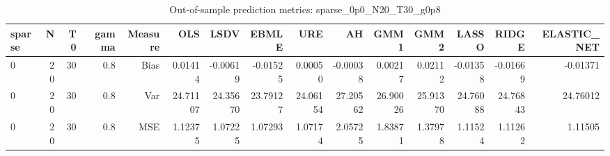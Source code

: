 \begin{table}[!htbp]\centering
\caption{Out-of-sample prediction metrics: sparse_0p0_N20_T30_g0p8}
\label{tab:table3_sparse_0p0_N20_T30_g0p8}
\begin{tabular}{lrrrrrrrrrrrrrr}
\hline
sparse & N & T0 & gamma & Measure & OLS & LSDV & EBMLE & URE & AH & GMM1 & GMM2 & LASSO & RIDGE & ELASTIC_NET \\
\hline
0 & 20 & 30 & 0.8 & Bias & 0.01414 & -0.00619 & -0.01525 & 0.00050 & -0.00038 & 0.00217 & 0.02112 & -0.01358 & -0.01669 & -0.01371 \\
0 & 20 & 30 & 0.8 & Var & 24.71107 & 24.35670 & 23.79127 & 24.06154 & 27.20562 & 26.90026 & 25.91370 & 24.76088 & 24.76843 & 24.76012 \\
0 & 20 & 30 & 0.8 & MSE & 1.12375 & 1.07225 & 1.07293 & 1.07174 & 2.05725 & 1.83871 & 1.37978 & 1.11524 & 1.11262 & 1.11505 \\
\hline
\end{tabular}
\end{table}

